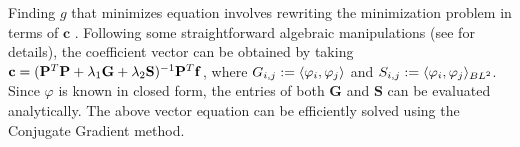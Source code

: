 Finding $g$ that minimizes equation  involves rewriting the minimization problem in terms of $\mathbf{c}$ \cite{xu2012rec}. Following some straightforward algebraic manipulations (see \cite{xu2012rec} for details), the coefficient vector can be obtained by taking $\mathbf{c} = ( \mathbf{\Phii}^T\mathbf{\Phii} + \lambda_1\mathbf{G} + \lambda_2\mathbf{S})^{-1}\mathbf{\Phii}^T\mathbf{f}$, where $G_{i,j}:=\innerp{\varphi_i}{\varphi_j}$ and $S_{i,j}:=\blip{2}{\varphi_i}{\varphi_j}$. Since $\varphi$ is known in closed form, the entries of both $\mathbf{G}$ and $\mathbf{S}$ can be evaluated analytically. The above vector equation can be efficiently solved using the Conjugate Gradient method.
